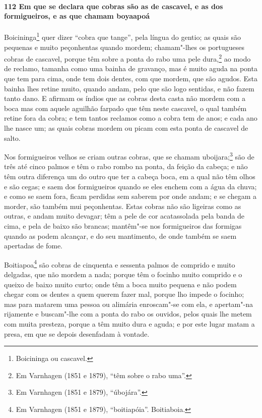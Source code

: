 \begin{linenumbers}
\paragraph{112 Em que se declara que cobras são as de cascavel, e as dos formigueiros, e
as que chamam boyaapoá}\quad
Boicininga\footnote{ Boicininga ou cascavel.} quer dizer ``cobra que tange'', pela língua
do gentio; as quais são pequenas e muito peçonhentas quando mordem; chamam"-lhes os
portugueses cobras de cascavel, porque têm sobre a ponta do rabo uma pele dura,\footnote{
Em Varnhagen (1851 e 1879), ``têm sobre o rabo uma''.} ao modo de reclamo, tamanha como
uma bainha de gravanço, mas é muito aguda na ponta que tem para cima, onde tem dois
dentes, com que mordem, que são agudos. Esta bainha lhes retine muito, quando andam, pelo
que são logo sentidas, e não fazem tanto dano. E afirmam os índios que as cobras desta
casta não mordem com a boca mas com aquele aguilhão farpado que têm neste cascavel, o qual
também retine fora da cobra; e tem tantos reclamos como a cobra tem de anos; e cada ano
lhe nasce um; as quais cobras mordem ou picam com esta ponta de cascavel de salto.

Nos formigueiros velhos se criam outras cobras, que se chamam uboijara;\footnote{ Em
Varnhagen (1851 e 1879), ``úbojára''.} são de três até cinco palmos e têm o rabo rombo na
ponta, da feição da cabeça; e não têm outra diferença um do outro que ter a cabeça boca,
em a qual não têm olhos e são cegas; e saem dos formigueiros quando se eles enchem com a
água da chuva; e como se saem fora, ficam perdidas sem saberem por onde andam; e se chegam
a morder, são também mui peçonhentas. Estas cobras não são ligeiras como as outras, e
andam muito devagar; têm a pele de cor acatassolada pela banda de cima, e pela de baixo
são brancas; mantêm"-se nos formigueiros das formigas quando as podem alcançar, e do seu
mantimento, de onde também se saem apertadas de fome.

Boitiapoa\footnote{ Em Varnhagen (1851 e 1879), ``boitiapóia''. Boitiaboia.} são cobras de
cinquenta e sessenta palmos de comprido e muito delgadas, que não mordem a nada; porque
têm o focinho muito comprido e o queixo de baixo muito curto; onde têm a boca muito
pequena e não podem chegar com os dentes a quem querem fazer mal, porque lho impede o
focinho; mas para matarem uma pessoa ou alimária enroscam"-se com ela, e apertam"-na
rijamente e buscam"-lhe com a ponta do rabo os ouvidos, pelos quais lhe metem com muita
presteza, porque a têm muito dura e aguda; e por este lugar matam a presa, em que se
depois desenfadam à vontade.


\end{linenumbers}
